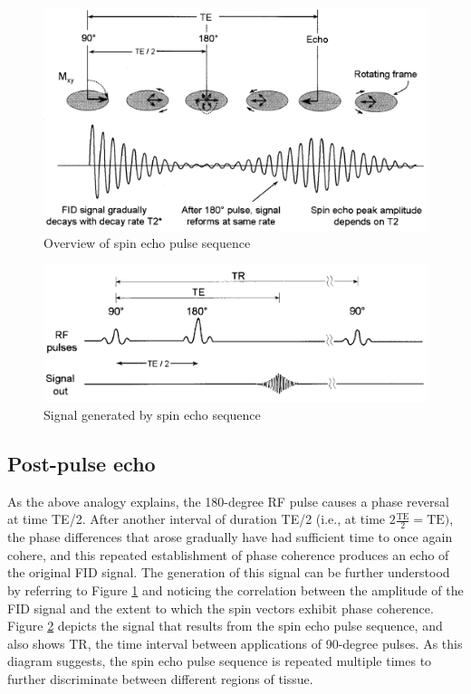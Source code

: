 \documentclass[12pt]{article} %
\begin{document}
\begin{figure}[h]
\centering
\includegraphics[scale=0.6]{./images/spin_echo_overview.png}
\caption{Overview of spin echo pulse sequence \cite{bushberg2002}}
\label{fig:spin_echo_overview}
\end{figure}

\begin{figure}[h]
\centering
\includegraphics[scale=0.6]{./images/spin_echo_signal.png}
\caption{Signal generated by spin echo sequence \cite{bushberg2002}}
\label{fig:spin_echo_signal}
\end{figure}

\subsection{Post-pulse echo}
As the above analogy explains, the 180-degree RF pulse causes a phase reversal at time TE/2. After another interval of duration TE/2 (i.e., at time $2\frac{\text{TE}}{2} = \text{TE})$, the phase differences that arose gradually have had sufficient time to once again cohere, and this repeated establishment of phase coherence produces an echo of the original FID signal. The generation of this signal can be further understood by referring to Figure \ref{fig:spin_echo_overview} and noticing the correlation between the amplitude of the FID signal and the extent to which the spin vectors exhibit phase coherence. Figure \ref{fig:spin_echo_signal} depicts the signal that results from the spin echo pulse sequence, and also shows TR, the time interval between applications of 90-degree pulses. As this diagram suggests, the spin echo pulse sequence is repeated multiple times to further discriminate between different regions of tissue.
\end{document}
